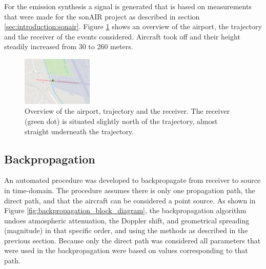 
For the emission synthesis a signal is generated that is based on measurements
that were made for the sonAIR project as described in section
\ref{sec:introduction:sonair}. Figure \ref{fig:figure_trajectory} shows an
overview of the airport, the trajectory and the receiver of the events
considered. Aircraft took off and their height steadily increased from 30 to 260
meters.



\begin{figure}[H]
  \centering
  \includegraphics[width=0.3\textwidth]{../figures/manual/auralisation-paper/figure_trajectory}
  \caption{Overview of the airport, trajectory and the receiver. The receiver
(green dot) is situated slightly north of the trajectory, almost straight underneath the
trajectory.}
  \label{fig:figure_trajectory}
\end{figure}


\subsection{Backpropagation}
An automated procedure was developed to backpropagate from receiver to source in
time-domain. The procedure assumes there is only one propagation path,
the direct path, and that the aircraft can be considered a point source.
As shown in Figure \ref{fig:backpropagation_block_diagram}, the
backpropagation algorithm undoes atmospheric attenuation, the Doppler shift, and
geometrical spreading (magnitude) in that specific order, and using the methods as
described in the previous section.
Because only the direct path was considered all parameters that were used in the
backpropagation were based on values corresponding to that path.

